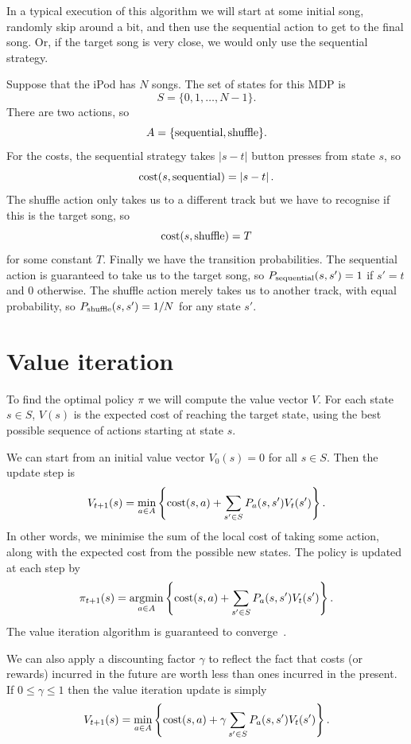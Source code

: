 \documentclass[12pt,amstags,fleqn]{article}
\theoremstyle{plain}
\theoremstyle{definition}
\theoremstyle{definition}
\begin{document}
In a typical execution of this algorithm we will start at some
initial song, randomly skip around a bit, and then use the sequential
action to get to the final song. Or, if the target song is very close,
we would only use the sequential strategy.

Suppose that the iPod has $N$ songs. The set of states for this MDP
is
\[
S = \{0, 1, \dots, N-1\}.
\]
There are two actions, so
\[
A = \{ \textnormal{sequential}, \textnormal{shuffle} \}.
\]
For the costs, the sequential strategy takes
$\left| s - t \right|$ button presses from state  $s$, so
\[
\textnormal{cost}(s, \textnormal{sequential}) = \left| s - t \right|.
\]
The shuffle action only takes us to a different track but we have to
recognise if this is the target song, so
\[
 \textnormal{cost}(s, \textnormal{shuffle}) = T
\]
for some constant $T$.
Finally we have the transition probabilities. The sequential action is
guaranteed to take us to the target song, so
$P_{\textnormal{sequential}}(s,s') = 1$ if $s' = t$ and $0$ otherwise.
The shuffle action merely takes us to another track, with equal
probability, so
$P_{\textnormal{shuffle}}(s,s') = 1/N$ for any state $s'$.

\section{Value iteration}

To find the optimal policy $\pi$ we will compute the value vector $V$.
For each state $s \in S$, $V(s)$ is the expected cost of reaching the
target state, using the best possible sequence of actions starting at
state $s$.

We can start from an initial value vector $V_0(s) = 0$ for all $s \in
S$. Then the update step is
\[
V_{t+1}(s) = \min_{a \in A} \left\{ \textnormal{cost}(s,a) + \sum_{s' \in S} P_a(s,s') V_t(s')\right\}.
\]
In other words, we minimise the sum of the local cost of taking some
action, along with the expected cost from the possible new states.
The policy is updated at each step by
\[
\pi_{t+1}(s) = \underset{a \in A}{\operatorname{argmin}} 
 \left\{ \textnormal{cost}(s,a) + \sum_{s' \in S} P_a(s,s') V_t(s')\right\}.
\]
The value iteration algorithm is guaranteed to
converge~\cite{viconvergence}.

We can also apply a discounting factor $\gamma$ to reflect the fact that
costs (or rewards) incurred in the future are worth less than ones
incurred in the present. If $0 \leq \gamma \leq 1$ then the value iteration
update is simply
\[
V_{t+1}(s) = \min_{a \in A} \left\{ \textnormal{cost}(s,a) + \gamma \sum_{s' \in S} P_a(s,s') V_t(s')\right\}.
\]
\end{document}
